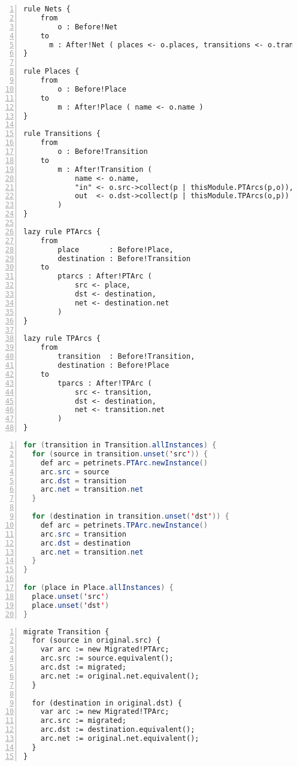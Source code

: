 \begin{lstlisting}[basicstyle=\ttfamily\footnotesize, flexiblecolumns=true, numbers=left, nolol=true, caption=Petri nets model migration in ATL, label=lst:quantitive_etl, language=ETL, tabsize=2]
rule Nets {
	from
		o : Before!Net
	to
	  m : After!Net ( places <- o.places, transitions <- o.transitions )
}

rule Places {
	from
		o : Before!Place
	to
		m : After!Place ( name <- o.name )
}

rule Transitions {
	from
		o : Before!Transition
	to
		m : After!Transition (
			name <- o.name,
			"in" <- o.src->collect(p | thisModule.PTArcs(p,o)),
			out  <- o.dst->collect(p | thisModule.TPArcs(o,p))
		)
}

lazy rule PTArcs {
	from
		place       : Before!Place,
		destination : Before!Transition
	to
		ptarcs : After!PTArc (
			src <- place,
			dst <- destination,
			net <- destination.net
		)
}

lazy rule TPArcs {
	from
		transition  : Before!Transition,
		destination : Before!Place
	to
		tparcs : After!TPArc (
			src <- transition,
			dst <- destination,
			net <- transition.net
		)
}
\end{lstlisting}


\begin{lstlisting}[basicstyle=\ttfamily\footnotesize, flexiblecolumns=true, numbers=left, nolol=true, caption=Petri nets model migration in COPE, label=lst:quantitive_cope, language=Java, tabsize=2]
for (transition in Transition.allInstances) {
  for (source in transition.unset('src')) {
    def arc = petrinets.PTArc.newInstance()
    arc.src = source
    arc.dst = transition
    arc.net = transition.net
  }

  for (destination in transition.unset('dst')) {
    def arc = petrinets.TPArc.newInstance() 
    arc.src = transition
    arc.dst = destination
    arc.net = transition.net
  }
}

for (place in Place.allInstances) {
  place.unset('src')
  place.unset('dst')
}
\end{lstlisting}


\begin{lstlisting}[basicstyle=\ttfamily\footnotesize, flexiblecolumns=true, numbers=left, nolol=true, caption=Petri nets model migration in Flock, label=lst:quantitive_flock, language=Flock, tabsize=2]
migrate Transition {
  for (source in original.src) {
    var arc := new Migrated!PTArc;
    arc.src := source.equivalent();
    arc.dst := migrated;
    arc.net := original.net.equivalent();
  }

  for (destination in original.dst) {
    var arc := new Migrated!TPArc;
    arc.src := migrated;
    arc.dst := destination.equivalent();
    arc.net := original.net.equivalent();
  }
}
\end{lstlisting}

